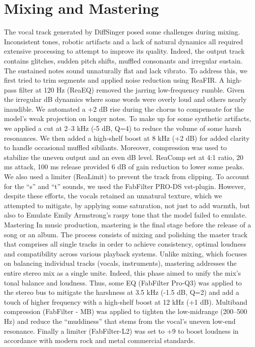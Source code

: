 \documentclass[a4paper]{article}
\begin{document}
	\newpage
	
	\section{Mixing and Mastering}

	The vocal track generated by DiffSinger posed some challenges during mixing. Inconsistent tones, robotic artifacts and a lack of natural dynamics all required extensive processing to attempt to improve its quality. Indeed, the output track contains glitches, sudden pitch shifts, muffled consonants and irregular sustain. The sustained notes sound unnaturally flat and lack vibrato. To address this, we first tried to trim segments and applied noise reduction using ReaFIR. A high-pass filter at 120 Hz (ReaEQ) removed the jarring low-frequency rumble. Given the irregular dB dynamics where some words were overly loud and others nearly inaudible. We automated a +2 dB rise during the chorus to compensate for the model’s weak projection on longer notes. To make up for some synthetic artifacts, we applied a cut at 2–3 kHz (-5 dB, Q=4) to reduce the volume of some harsh resonances. We then added a high-shelf boost at 8 kHz (+2 dB) for added clarity to handle occasional muffled sibilants. Moreover, compression was used to stabilize the uneven output and an even dB level. ReaComp set at 4:1 ratio, 20 ms attack, 100 ms release provided 6 dB of gain reduction to lower some peaks. We also used  a limiter (ReaLimit) to prevent the track from clipping. To account for the “s” and “t” sounds, we used the FabFilter PRO-DS vst-plugin. However, despite these efforts, the vocals retained an unnatural texture, which we attempted to mitigate, by applying some saturation, not just to add warmth, but also to Emulate Emily Armstrong’s raspy tone that the model failed to emulate. 
	Mastering
	In music production, mastering is the final stage before the release of a song or an album. The process consists of mixing and polishing the master track that comprises all single tracks in order to achieve consistency, optimal loudness and compatibility across various playback systems. Unlike mixing, which focuses on balancing individual tracks (vocals, instruments), mastering addresses the entire stereo mix as a single unite. Indeed, this phase aimed to unify the mix’s tonal balance and loudness. Thus, some EQ (FabFilter Pro-Q3) was applied to the stereo bus to mitigate the harshness at 3.5 kHz (-1.5 dB, Q=2) and add a touch of higher frequency with a high-shelf boost at 12 kHz (+1 dB). Multiband compression (FabFilter - MB) was applied to tighten the low-midrange (200–500 Hz) and reduce the “muddiness” that stems from the vocal’s uneven low-end resonance. Finally a limiter (FabFilter-L2) was set to +9 to boost loudness in accordance with modern rock and metal commercial standards.
\end{document}
